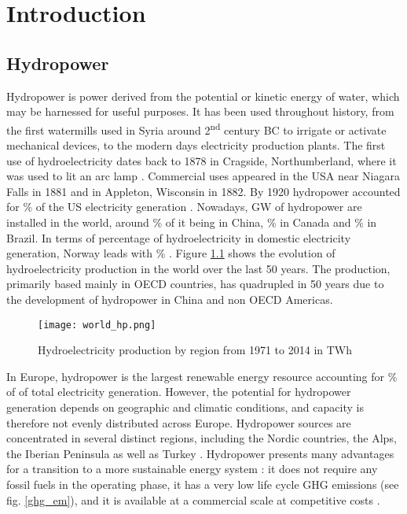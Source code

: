 \chapter{Introduction}
\label{chap:introduction}


\section{Hydropower}

Hydropower is power derived from the potential or kinetic energy of water, which may be harnessed for useful purposes. It has been used throughout history, from the first watermills used in Syria around 2\textsuperscript{nd} century BC \cite{reynolds} to irrigate or activate mechanical devices, to the modern days electricity production plants. The first use of hydroelectricity dates back to 1878 in Cragside, Northumberland, where it was used to lit an arc lamp \cite{indus_arch}. Commercial uses appeared in the USA near Niagara Falls in 1881 and in Appleton, Wisconsin in 1882. By 1920 hydropower accounted for \unit[25]{\%} of the US electricity generation \cite{hist_hyd}. \newline
Nowadays, \unit[1171]{GW} of hydropower are installed in the world, around \unit[27]{\%} of it being in China, \unit[10]{\%} in Canada and \unit[9]{\%} in Brazil. In terms of percentage of hydroelectricity in domestic electricity generation, Norway leads with \unit[96]{\%} \cite{iea_stat}. Figure \ref{world_hp} shows the evolution of hydroelectricity production in the world over the last 50 years. The production, primarily based mainly in OECD countries, has quadrupled in 50 years due to the development of hydropower in China and non OECD Americas.

\begin{figure}[H]
\centering
\texttt{[image: world\_hp.png]}
\caption[Hydroelectricity production by region from 1971 to 2014 in TWh]{Hydroelectricity production by region from 1971 to 2014 in TWh \cite{iea_stat}}
\centering
\label{world_hp}
\end{figure}

In Europe, hydropower is the largest renewable energy resource accounting for \unit[18]{\%} of of total electricity generation. However, the potential for hydropower generation depends on geographic and climatic conditions, and capacity is therefore not evenly distributed across Europe. Hydropower sources are concentrated in several distinct regions, including the Nordic countries, the Alps, the Iberian Peninsula as well as Turkey \cite{hp_europe}. Hydropower presents many advantages for a transition to a more sustainable energy system : it does not require any fossil fuels in the operating phase, it has a very low life cycle GHG emissions (see fig. \ref{ghg_em}), and it is available at a commercial scale at competitive costs \cite{hp_europe}. 

